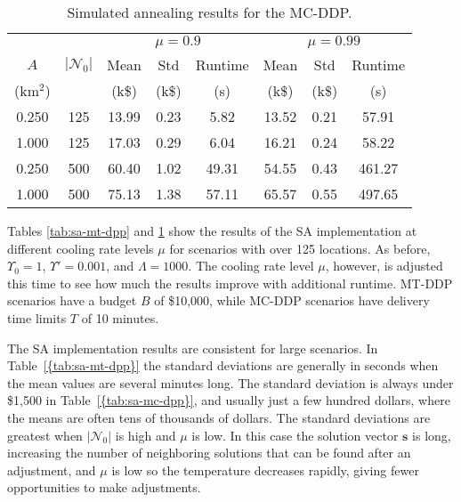 \documentclass[journal]{IEEEtran}
\begin{document}
\begin{table}[t]        
\caption{Simulated annealing results for the MC-DDP.}
\label{tab:sa-mc-dpp}                                               
\centering                                                              
\begin{tabular}{|c c | c c c |c c c|}                                        
\hline                                                                  
 &  & \multicolumn{3}{c|}{${\ensuremath{\mu}}=0.9$} & \multicolumn{3}{c|}{${\ensuremath{\mu}}=0.99$} \\
${\ensuremath{A}}$ & $|{\ensuremath{{\ensuremath{\mathcal{N}}}_{0}}}{}|$ & Mean & Std & Runtime & Mean & Std & Runtime \\
(km$^2$) &  & (k\$) & (k\$) & (s) & (k\$) & (k\$) & (s) \\
\hline                           
0.250 & 125 & 13.99 & 0.23 & 5.82 & 13.52 & 0.21 & 57.91 \\  
1.000 & 125 & 17.03 & 0.29 & 6.04 & 16.21 & 0.24 & 58.22 \\  
0.250 & 500 & 60.40 & 1.02 & 49.31 & 54.55 & 0.43 & 461.27 \\
1.000 & 500 & 75.13 & 1.38 & 57.11 & 65.57 & 0.55 & 497.65 \\
\hline
\end{tabular}                                                                                                        
\end{table}

Tables \ref{tab:sa-mt-dpp} and \ref{tab:sa-mc-dpp} show the results of the SA implementation at different cooling rate levels ${\ensuremath{\mu}}$ for scenarios with over 125 locations. As before, ${\ensuremath{{\ensuremath{\Upsilon}}_0}}=1$, ${\ensuremath{{\ensuremath{\Upsilon}}'}}=0.001$, and ${\ensuremath{\Lambda}}=1000$. The cooling rate level ${\ensuremath{\mu}}$, however, is adjusted this time to see how much the results improve with additional runtime. MT-DDP scenarios have a budget ${\ensuremath{B}}$ of \$10,000, while MC-DDP scenarios have delivery time limits ${\ensuremath{T}}$ of 10 minutes.

The SA implementation results are consistent for large scenarios. In {Table~\ref{{tab:sa-mt-dpp}}} the standard deviations are generally in seconds when the mean values are several minutes long. The standard deviation is always under \$1,500 in {Table~\ref{{tab:sa-mc-dpp}}}, and usually just a few hundred dollars, where the means are often tens of thousands of dollars. The standard deviations are greatest when $|{\ensuremath{{\ensuremath{\mathcal{N}}}_{0}}}{}|$ is high and ${\ensuremath{\mu}}$ is low. In this case the solution vector ${\ensuremath{\mathbf{s}}}$ is long, increasing the number of neighboring solutions that can be found after an adjustment, and ${\ensuremath{\mu}}$ is low so the temperature decreases rapidly, giving fewer opportunities to make adjustments.
\end{document}
